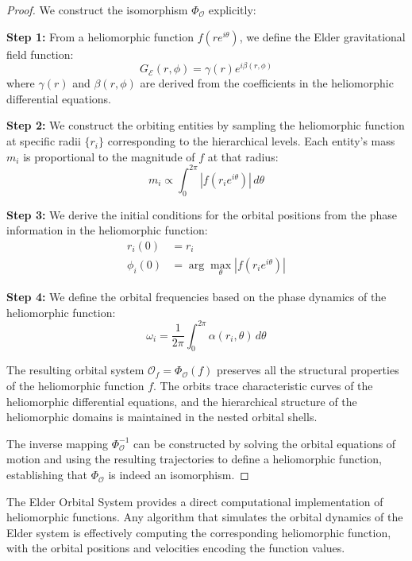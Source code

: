\begin{proof}
We construct the isomorphism $\Phi_{\mathcal{O}}$ explicitly:

\textbf{Step 1:} From a heliomorphic function $f(re^{i\theta})$, we define the Elder gravitational field function:
\begin{equation}
G_{\mathcal{E}}(r,\phi) = \gamma(r)e^{i\beta(r,\phi)}
\end{equation}
where $\gamma(r)$ and $\beta(r,\phi)$ are derived from the coefficients in the heliomorphic differential equations.

\textbf{Step 2:} We construct the orbiting entities by sampling the heliomorphic function at specific radii $\{r_i\}$ corresponding to the hierarchical levels. Each entity's mass $m_i$ is proportional to the magnitude of $f$ at that radius:
\begin{equation}
m_i \propto \int_0^{2\pi} |f(r_ie^{i\theta})| \, d\theta
\end{equation}

\textbf{Step 3:} We derive the initial conditions for the orbital positions from the phase information in the heliomorphic function:
\begin{align}
r_i(0) &= r_i \\
\phi_i(0) &= \arg\max_{\theta} |f(r_ie^{i\theta})|
\end{align}

\textbf{Step 4:} We define the orbital frequencies based on the phase dynamics of the heliomorphic function:
\begin{equation}
\omega_i = \frac{1}{2\pi}\int_0^{2\pi} \alpha(r_i,\theta) \, d\theta
\end{equation}

The resulting orbital system $\mathcal{O}_f = \Phi_{\mathcal{O}}(f)$ preserves all the structural properties of the heliomorphic function $f$. The orbits trace characteristic curves of the heliomorphic differential equations, and the hierarchical structure of the heliomorphic domains is maintained in the nested orbital shells.

The inverse mapping $\Phi_{\mathcal{O}}^{-1}$ can be constructed by solving the orbital equations of motion and using the resulting trajectories to define a heliomorphic function, establishing that $\Phi_{\mathcal{O}}$ is indeed an isomorphism.
\end{proof}

\begin{corollary}
\label{cor:computational_implementation}
The Elder Orbital System provides a direct computational implementation of heliomorphic functions. Any algorithm that simulates the orbital dynamics of the Elder system is effectively computing the corresponding heliomorphic function, with the orbital positions and velocities encoding the function values.
\end{corollary}

